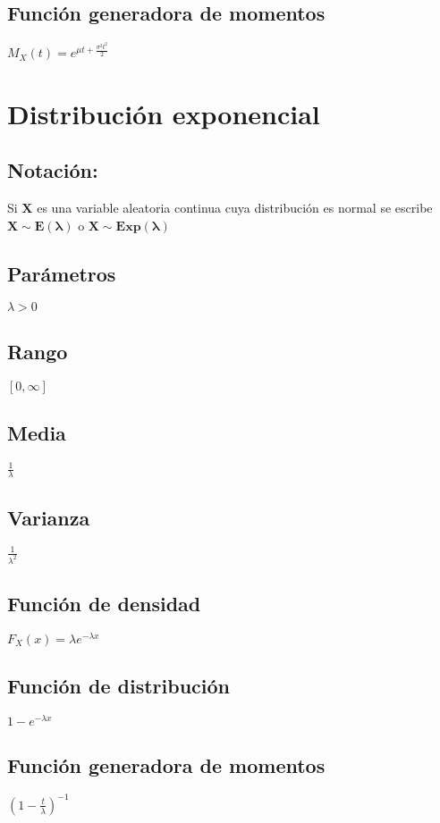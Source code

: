 \documentclass[es-lat]{article}
\begin{document}
\subsection{Función generadora de momentos}
$M_{X}(t)=e^{\mu t+\frac{\sigma^{2}t^{2} }{2}}$

\section{Distribución exponencial}
\subsection{Notación:}

Si $\mathbf{X}$ es una variable aleatoria continua cuya distribución es normal se escribe $\mathbf{X\sim E(\lambda)}$ o $\mathbf{X\sim Exp(\lambda)}$

\subsection{Parámetros}
$\lambda>0$

\subsection{Rango}
$[0,\infty]$

\subsection{Media}
$\frac{1}{\lambda}$

\subsection{Varianza}
$\frac{1}{\lambda^{2}}$

\subsection{Función de densidad}
$F_{X}(x)=\lambda e^{-\lambda x}$

\subsection{Función de distribución}
$1- e^{-\lambda x}$

\subsection{Función generadora de momentos}
$(1-\frac{t}{\lambda})^{-1}$
\end{document}
